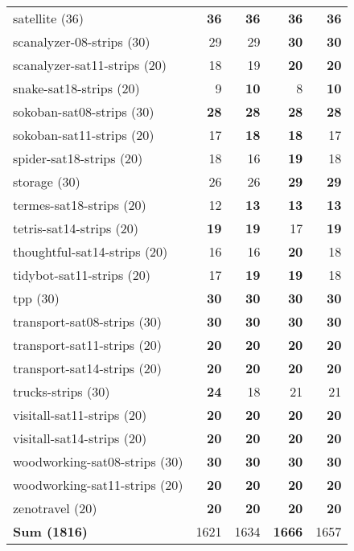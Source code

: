 \documentclass{article}
\newcommand{\numtasks}[1]{\small{(#1)}}
\begin{document}
\begin{tabular}{@{}lrrrr@{}}
satellite \numtasks{36} & \textbf{36} & \textbf{36} & \textbf{36} & \textbf{36} \\
scanalyzer-08-strips \numtasks{30} & 29 & 29 & \textbf{30} & \textbf{30} \\
scanalyzer-sat11-strips \numtasks{20} & 18 & 19 & \textbf{20} & \textbf{20} \\
snake-sat18-strips \numtasks{20} & 9 & \textbf{10} & 8 & \textbf{10} \\
sokoban-sat08-strips \numtasks{30} & \textbf{28} & \textbf{28} & \textbf{28} & \textbf{28} \\
sokoban-sat11-strips \numtasks{20} & 17 & \textbf{18} & \textbf{18} & 17 \\
spider-sat18-strips \numtasks{20} & 18 & 16 & \textbf{19} & 18 \\
storage \numtasks{30} & 26 & 26 & \textbf{29} & \textbf{29} \\
termes-sat18-strips \numtasks{20} & 12 & \textbf{13} & \textbf{13} & \textbf{13} \\
tetris-sat14-strips \numtasks{20} & \textbf{19} & \textbf{19} & 17 & \textbf{19} \\
thoughtful-sat14-strips \numtasks{20} & 16 & 16 & \textbf{20} & 18 \\
tidybot-sat11-strips \numtasks{20} & 17 & \textbf{19} & \textbf{19} & 18 \\
tpp \numtasks{30} & \textbf{30} & \textbf{30} & \textbf{30} & \textbf{30} \\
transport-sat08-strips \numtasks{30} & \textbf{30} & \textbf{30} & \textbf{30} & \textbf{30} \\
transport-sat11-strips \numtasks{20} & \textbf{20} & \textbf{20} & \textbf{20} & \textbf{20} \\
transport-sat14-strips \numtasks{20} & \textbf{20} & \textbf{20} & \textbf{20} & \textbf{20} \\
trucks-strips \numtasks{30} & \textbf{24} & 18 & 21 & 21 \\
visitall-sat11-strips \numtasks{20} & \textbf{20} & \textbf{20} & \textbf{20} & \textbf{20} \\
visitall-sat14-strips \numtasks{20} & \textbf{20} & \textbf{20} & \textbf{20} & \textbf{20} \\
woodworking-sat08-strips \numtasks{30} & \textbf{30} & \textbf{30} & \textbf{30} & \textbf{30} \\
woodworking-sat11-strips \numtasks{20} & \textbf{20} & \textbf{20} & \textbf{20} & \textbf{20} \\
zenotravel \numtasks{20} & \textbf{20} & \textbf{20} & \textbf{20} & \textbf{20} \\
\textbf{Sum \numtasks{1816}} & 1621 & 1634 & \textbf{1666} & 1657 \\
\end{tabular}
\end{document}
